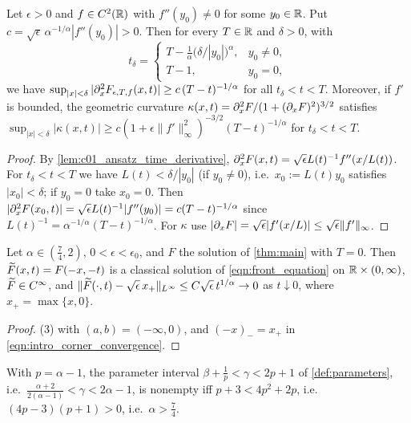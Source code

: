 \begin{lemma}
  \label{lem:c01_curvature_blowup}
  Let $\epsilon>0$ and $f\in C^2(\mathbb{R})$ with $f''(y_0)\ne0$ for some $y_0\in\mathbb{R}$.  Put
  $c=\sqrt\epsilon\,\alpha^{-1/\alpha}|f''(y_0)|>0$.  Then for every $T\in\mathbb{R}$ and $\delta>0$, with
  \[
    t_\delta=\begin{cases}T-\frac1\alpha\bigl(\delta/|y_0|\bigr)^\alpha,& y_0\ne0,\\ T-1,& y_0=0,\end{cases}
  \]
  we have $\sup_{|x|<\delta}|\partial_x^2F_{\epsilon,T,f}(x,t)|\ge c\,(T-t)^{-1/\alpha}$ for all
  $t_\delta<t<T$.  Moreover, if $f'$ is bounded, the geometric curvature
  $\kappa(x,t)=\partial_x^2F/(1+(\partial_xF)^2)^{3/2}$ satisfies
  $\sup_{|x|<\delta}|\kappa(x,t)|\ge c(1+\epsilon\|f'\|_\infty^2)^{-3/2}(T-t)^{-1/\alpha}$ for
  $t_\delta<t<T$.
\end{lemma}
\begin{proof}
  By \cref{lem:c01_ansatz_time_derivative}, $\partial_x^2F(x,t)=\sqrt\epsilon L(t)^{-1}f''(x/L(t))$.  For
  $t_\delta<t<T$ we have $L(t)<\delta/|y_0|$ (if $y_0\ne0$), i.e.\ $x_0:=L(t)y_0$ satisfies
  $|x_0|<\delta$; if $y_0=0$ take $x_0=0$.  Then
  $|\partial_x^2F(x_0,t)|=\sqrt\epsilon L(t)^{-1}|f''(y_0)|=c(T-t)^{-1/\alpha}$ since
  $L(t)^{-1}=\alpha^{-1/\alpha}(T-t)^{-1/\alpha}$.  For $\kappa$ use
  $|\partial_xF|=\sqrt\epsilon|f'(x/L)|\le\sqrt\epsilon\|f'\|_\infty$.
\end{proof}

\begin{corollary}
  \label{cor:c01_desingularization}
  Let $\alpha\in(\frac74,2)$, $0<\epsilon<\epsilon_0$, and $F$ the solution of \cref{thm:main} with
  $T=0$.  Then $\widetilde{F}(x,t)=F(-x,-t)$ is a classical solution of \eqref{eqn:front_equation} on
  $\mathbb{R}\times(0,\infty)$, $\widetilde{F}\in C^\infty$, and $\|\widetilde{F}(\cdot,t)-\sqrt\epsilon\,x_+\|_{L^\infty}\le
  C\sqrt\epsilon\,t^{1/\alpha}\to0$ as $t\downarrow0$, where $x_+=\max\{x,0\}$.
\end{corollary}
\begin{proof}
  (3) with $(a,b)=(-\infty,0)$, and $(-x)_-=x_+$ in
  \eqref{eqn:intro_corner_convergence}.
\end{proof}

\begin{remark}
  With $p=\alpha-1$, the parameter interval $\beta+\frac1p<\gamma<2p+1$ of \cref{def:parameters},
  i.e.\ $\frac{\alpha+2}{2(\alpha-1)}<\gamma<2\alpha-1$, is nonempty iff
  $p+3<4p^2+2p$, i.e.\ $(4p-3)(p+1)>0$, i.e.\ $\alpha>\frac74$.
\end{remark}
